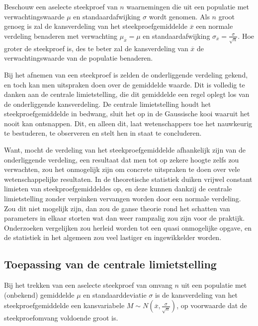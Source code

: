\begin{definition}
Beschouw een aselecte steekproef van $n$ waarnemingen die uit een populatie met verwachtingswaarde $\mu$ en standaardafwijking $\sigma$ wordt genomen. Als $n$ groot genoeg is zal de kansverdeling van het steekproefgemiddelde $\overline{x}$ een normale verdeling benaderen met verwachting $\mu_{\overline{x}} = \mu$ en standaardafwijking $\sigma_{\overline{x}} = \frac{\sigma}{\sqrt{n}}$. Hoe groter de steekproef is, des te beter zal de kansverdeling van $\overline{x}$ de verwachtingswaarde van de populatie benaderen.

\end{definition}

Bij het afnemen van een steekproef is zelden de onderliggende verdeling gekend, en toch kan men uitspraken doen over de gemiddelde waarde. Dit is volledig te danken aan de centrale limietstelling, die dit gemiddelde een regel oplegt los van de onderliggende kansverdeling. De centrale limietstelling houdt het steekproefgemiddelde in bedwang, sluit het op in de Gaussische kooi waaruit het nooit kan ontsnappen. Dit, en alleen dit, laat wetenschappers toe het nauwkeurig te bestuderen, te observeren en stelt hen in staat te concluderen.

Want, mocht de verdeling van het steekproefgemiddelde afhankelijk zijn van de onderliggende verdeling, een resultaat dat men tot op zekere hoogte zelfs zou verwachten, zou het onmogelijk zijn om concrete uitspraken te doen over vele wetenschappelijke resultaten. In de theoretische statistiek duiken vrijwel constant limieten van steekproefgemiddeldes op, en deze kunnen dankzij de centrale limietstelling zonder verpinken vervangen worden door een normale verdeling. Zou dit niet mogelijk zijn, dan zou de ganse theorie rond het schatten van parameters in elkaar storten wat dan weer rampzalig zou zijn voor de praktijk. Onderzoeken vergelijken zou herleid worden tot een quasi onmogelijke opgave, en de statistiek in het algemeen zou veel lastiger en ingewikkelder worden.

\subsection{Toepassing van de centrale limietstelling}
Bij het trekken van een aselecte steekproef van omvang $n$ uit een populatie met (onbekend) gemiddelde $\mu$ en standaarddeviatie $\sigma$ is de kansverdeling van het steekproefgemiddelde een kansvariabele $M \sim N (\overline{x}, \frac{\sigma}{\sqrt{n}})$, op voorwaarde dat de steekproefomvang voldoende groot is.


